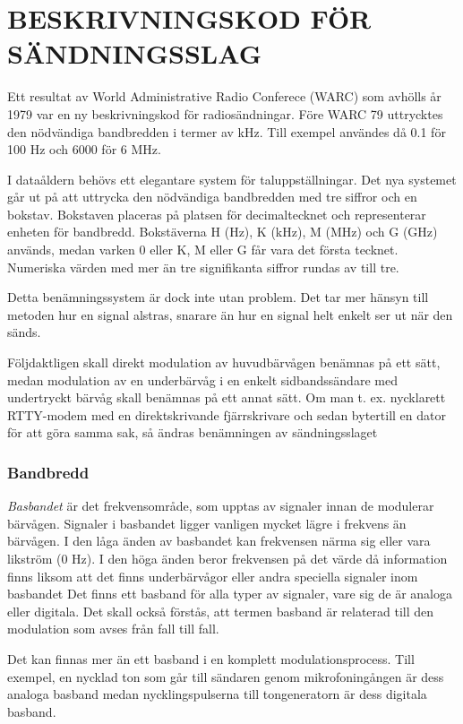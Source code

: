 \chapter{BESKRIVNINGSKOD FÖR SÄNDNINGSSLAG}

Ett resultat av World Administrative Radio Conferece (WARC) som
avhölls år 1979 var en ny beskrivningskod för radiosändningar.  Före
WARC 79 uttrycktes den nödvändiga bandbredden i termer av kHz. Till
exempel användes då 0.1 för 100 Hz och 6000 för 6 MHz.

I dataåldern behövs ett elegantare system för taluppställningar. Det
nya systemet går ut på att uttrycka den nödvändiga bandbredden med tre
siffror och en bokstav.  Bokstaven placeras på platsen för
decimaltecknet och representerar enheten för bandbredd. Bokstäverna H
(Hz), K (kHz), M (MHz) och G (GHz) används, medan varken 0 eller K, M
eller G får vara det första tecknet.  Numeriska värden med mer än tre
signifikanta siffror rundas av till tre.

Detta benämningssystem är dock inte utan problem. Det tar mer hänsyn
till metoden hur en signal alstras, snarare än hur en signal helt
enkelt ser ut när den sänds.

Följdaktligen skall direkt modulation av huvudbärvågen benämnas på ett
sätt, medan modulation av en underbärvåg i en enkelt sidbandssändare
med undertryckt bärvåg skall benämnas på ett annat sätt. Om man
t. ex. nycklarett RTTY-modem med en direktskrivande fjärrskrivare och
sedan bytertill en dator för att göra samma sak, så ändras benämningen
av sändningsslaget

\subsection{Bandbredd}

\emph{Basbandet} är det frekvensområde, som upptas av signaler innan
de modulerar bärvågen. Signaler i basbandet ligger vanligen mycket
lägre i frekvens än bärvågen. I den låga änden av basbandet kan
frekvensen närma sig eller vara likström (0 Hz). I den höga änden
beror frekvensen på det värde då information finns liksom att det
finns underbärvågor eller andra speciella signaler inom basbandet Det
finns ett basband för alla typer av signaler, vare sig de är analoga
eller digitala. Det skall också förstås, att termen basband är
relaterad till den modulation som avses från fall till fall.

Det kan finnas mer än ett basband i en komplett
modulationsprocess. Till exempel, en nycklad ton som går till sändaren
genom mikrofoningången är dess analoga basband medan nycklingspulserna
till tongeneratorn är dess digitala basband.


